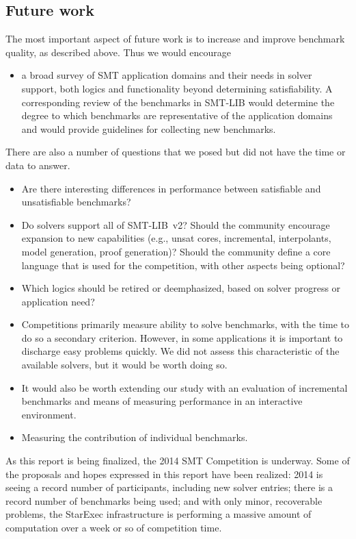 \documentclass[smallcondensed]{svjour3}
\begin{document}
\subsection{Future work}
The most important aspect of future work is to increase and improve benchmark quality, as described above. Thus we would encourage
\begin{itemize}
\item a broad survey of SMT application domains and their needs in solver support, both logics and functionality beyond determining satisfiability. 
A corresponding review of the benchmarks in SMT-LIB would determine the degree
to which benchmarks are representative of the application domains and would 
provide guidelines for collecting new benchmarks.
\end{itemize}
There are also a number of questions that we posed but did not have the time or data to answer. 
\begin{itemize}
\item Are there interesting differences in performance between satisfiable and unsatisfiable benchmarks?
\item Do solvers support all of SMT-LIB~v2? Should the community encourage expansion to new capabilities (e.g., unsat cores, incremental, interpolants, model generation, proof generation)? Should the community define a core language that is used for the competition, with other aspects being optional?
\item Which logics should be retired or deemphasized, based on solver progress or application need?
\item Competitions primarily measure ability to solve benchmarks, with the time to do so a secondary criterion. However, in some applications it is important to discharge easy problems quickly. We did not assess this characteristic of the available solvers, but it would be worth doing so.
\item It would also be worth extending our study with an evaluation of incremental benchmarks and means of measuring performance in an interactive environment.
\item Measuring the contribution of individual benchmarks.
\end{itemize}

As this report is being finalized, the 2014 SMT Competition is underway. Some of the proposals and hopes expressed in this report have been realized: 2014 is seeing a record number of participants, including new solver entries; there is a record number of benchmarks being used; and with only minor, recoverable problems, the StarExec infrastructure is performing a massive amount of computation over a week or so of competition time.
\end{document}
